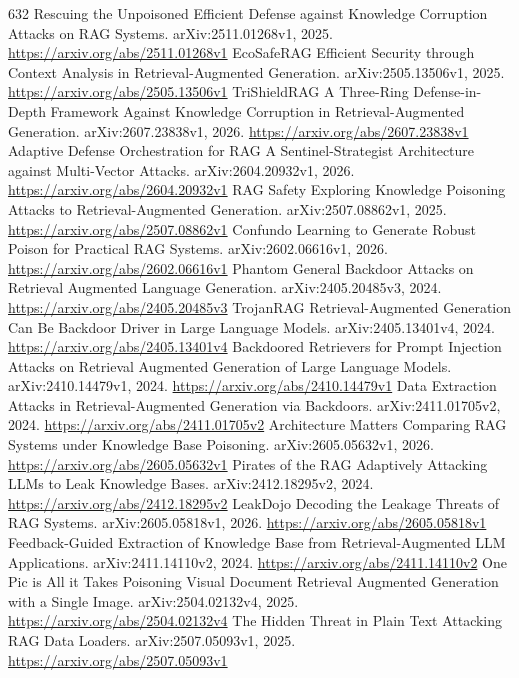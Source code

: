 \documentclass[11pt]{article}
\begin{document}
\begin{thebibliography}{632}
 Rescuing the Unpoisoned Efficient Defense against Knowledge Corruption Attacks on RAG Systems. arXiv:2511.01268v1, 2025. \url{https://arxiv.org/abs/2511.01268v1}
 EcoSafeRAG Efficient Security through Context Analysis in Retrieval-Augmented Generation. arXiv:2505.13506v1, 2025. \url{https://arxiv.org/abs/2505.13506v1}
 TriShieldRAG A Three-Ring Defense-in-Depth Framework Against Knowledge Corruption in Retrieval-Augmented Generation. arXiv:2607.23838v1, 2026. \url{https://arxiv.org/abs/2607.23838v1}
 Adaptive Defense Orchestration for RAG A Sentinel-Strategist Architecture against Multi-Vector Attacks. arXiv:2604.20932v1, 2026. \url{https://arxiv.org/abs/2604.20932v1}
 RAG Safety Exploring Knowledge Poisoning Attacks to Retrieval-Augmented Generation. arXiv:2507.08862v1, 2025. \url{https://arxiv.org/abs/2507.08862v1}
 Confundo Learning to Generate Robust Poison for Practical RAG Systems. arXiv:2602.06616v1, 2026. \url{https://arxiv.org/abs/2602.06616v1}
 Phantom General Backdoor Attacks on Retrieval Augmented Language Generation. arXiv:2405.20485v3, 2024. \url{https://arxiv.org/abs/2405.20485v3}
 TrojanRAG Retrieval-Augmented Generation Can Be Backdoor Driver in Large Language Models. arXiv:2405.13401v4, 2024. \url{https://arxiv.org/abs/2405.13401v4}
 Backdoored Retrievers for Prompt Injection Attacks on Retrieval Augmented Generation of Large Language Models. arXiv:2410.14479v1, 2024. \url{https://arxiv.org/abs/2410.14479v1}
 Data Extraction Attacks in Retrieval-Augmented Generation via Backdoors. arXiv:2411.01705v2, 2024. \url{https://arxiv.org/abs/2411.01705v2}
 Architecture Matters Comparing RAG Systems under Knowledge Base Poisoning. arXiv:2605.05632v1, 2026. \url{https://arxiv.org/abs/2605.05632v1}
 Pirates of the RAG Adaptively Attacking LLMs to Leak Knowledge Bases. arXiv:2412.18295v2, 2024. \url{https://arxiv.org/abs/2412.18295v2}
 LeakDojo Decoding the Leakage Threats of RAG Systems. arXiv:2605.05818v1, 2026. \url{https://arxiv.org/abs/2605.05818v1}
 Feedback-Guided Extraction of Knowledge Base from Retrieval-Augmented LLM Applications. arXiv:2411.14110v2, 2024. \url{https://arxiv.org/abs/2411.14110v2}
 One Pic is All it Takes Poisoning Visual Document Retrieval Augmented Generation with a Single Image. arXiv:2504.02132v4, 2025. \url{https://arxiv.org/abs/2504.02132v4}
 The Hidden Threat in Plain Text Attacking RAG Data Loaders. arXiv:2507.05093v1, 2025. \url{https://arxiv.org/abs/2507.05093v1}

\end{thebibliography}
\end{document}
